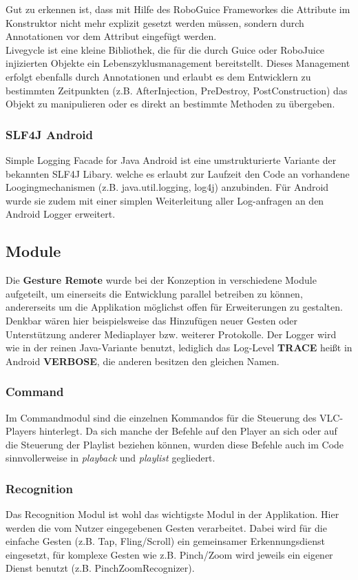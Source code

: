 \documentclass[a4paper,12pt]{article}
\begin{document}
Gut zu erkennen ist, dass mit Hilfe des RoboGuice Frameworkes die Attribute im Konstruktor nicht mehr explizit gesetzt werden müssen, sondern durch Annotationen vor dem Attribut eingefügt werden.\\
Livegycle ist eine kleine Bibliothek, die für die durch Guice oder RoboJuice injizierten Objekte ein Lebenszyklusmanagement bereitstellt. Dieses Management erfolgt ebenfalls durch Annotationen und erlaubt es dem Entwicklern zu bestimmten Zeitpunkten (z.B. AfterInjection, PreDestroy, PostConstruction) das Objekt zu manipulieren oder es direkt an bestimmte Methoden zu übergeben.\cite{lifegycle-libaries}

\subsubsection{SLF4J Android}
Simple Logging Facade for Java Android ist eine umstrukturierte Variante der bekannten SLF4J Libary. welche es erlaubt zur Laufzeit den Code an vorhandene Loogingmechanismen (z.B. java.util.logging, log4j) anzubinden. Für Android wurde sie zudem mit einer simplen Weiterleitung aller Log-anfragen an den Android Logger erweitert. 
\subsection{Module}

Die \textbf{Gesture Remote} wurde bei der Konzeption in verschiedene Module aufgeteilt, um einerseits die Entwicklung parallel betreiben zu können, andererseits um die Applikation möglichst offen für Erweiterungen zu gestalten. Denkbar wären hier beispielsweise das Hinzufügen neuer Gesten oder Unterstützung anderer Mediaplayer bzw. weiterer Protokolle. Der Logger wird wie in der reinen Java-Variante benutzt, lediglich das Log-Level \textbf{TRACE} heißt in Android \textbf{VERBOSE}, die anderen besitzen den gleichen Namen. \cite{sfl4j-android-libaries}

\subsubsection{Command}
Im Commandmodul sind die einzelnen Kommandos für die Steuerung des VLC-Players hinterlegt. Da sich manche der Befehle auf den Player an sich oder auf die Steuerung der Playlist beziehen können, wurden diese Befehle auch im Code sinnvollerweise in \textit{playback} und \textit{playlist} gegliedert.
\subsubsection{Recognition}
Das Recognition Modul ist wohl das wichtigste Modul in der Applikation. Hier werden die vom Nutzer eingegebenen Gesten verarbeitet. Dabei wird für die einfache Gesten (z.B. Tap, Fling/Scroll) ein gemeinsamer Erkennungsdienst eingesetzt, für komplexe Gesten wie z.B. Pinch/Zoom wird jeweils ein eigener Dienst benutzt (z.B. PinchZoomRecognizer).
\end{document}
